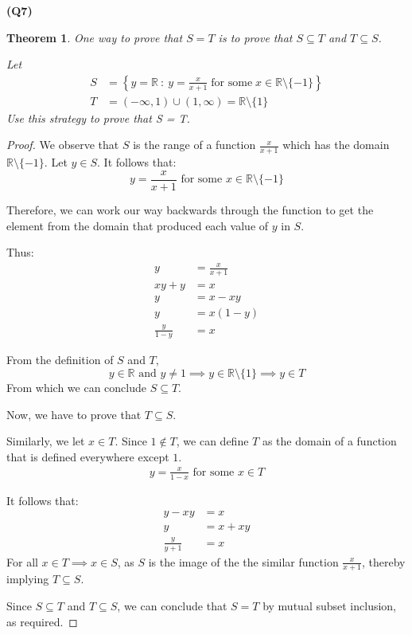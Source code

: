 \documentclass[12pt, a4paper]{article}
\newcommand{\R}{\mathbb{R}}
\newcommand{\open}[1]{\left(#1\right)}
\newcommand{\set}[2]{\left\{#1 \:\colon\: #2\right\}}
\newtheorem{theorem}{Theorem}
\begin{document}
\noindent\textbf{(Q7)}
\begin{theorem}
    One way to prove that $S = T$ is to prove that $S \subseteq T$ and $T \subseteq S$.

    Let
    \begin{align*}
        S & = \set{y = \R}{y = \frac{x}{x + 1}\;\text{for some}\;x \in \R \setminus \{-1\}}\\
        T & = \open{-\infty, 1} \cup \open{1, \infty} = \R \setminus \{1\}
    \end{align*}
    Use this strategy to prove that S = T.
\end{theorem}

\begin{proof}
    We observe that $S$ is the range of a function $\tfrac{x}{x + 1}$ which has the domain
    $\R \setminus \{-1\}$.
    Let $y \in S$. It follows that:
    \[
        y = \frac{x}{x + 1} \text{ for some } x \in \R \setminus \{-1\}
    \]

    Therefore, we can work our way backwards through the function to get the element from
    the domain that produced each value of $y$ in $S$.

    Thus:
    \begin{align*}
        y & = \frac{x}{x + 1}\\
        xy + y & = x\\
        y & = x - xy\\
        y & = x(1 - y)\\
        \frac{y}{1 - y} & = x
    \end{align*}  

    From the definition of $S$ and $T$,
    \[
        y \in \R \text{ and } y \neq 1 \implies y \in \R \setminus \{1\} \implies y \in T
    \]
    From which we can conclude $S \subseteq T$.

    Now, we have to prove that $T \subseteq S$.

    Similarly, we let $x \in T$. Since $1 \notin T$, we can define $T$ as the domain of
    a function that is defined everywhere except $1$.
    \begin{align*} 
        y = \frac{x}{1 - x} \text{ for some } x \in T
    \end{align*}

    It follows that:
    \begin{align*}
        y - xy & = x\\
        y & = x + xy\\
        \frac{y}{y + 1} & = x
    \end{align*}
    For all $x \in T \implies x \in S$, as $S$ is the image of the the similar function $\tfrac{x}{x + 1}$,
    thereby implying $T \subseteq S$.

    Since $S \subseteq T$ and $T \subseteq S$, we can conclude that $S = T$ by mutual
    subset inclusion, as required.
\end{proof}
\end{document}
